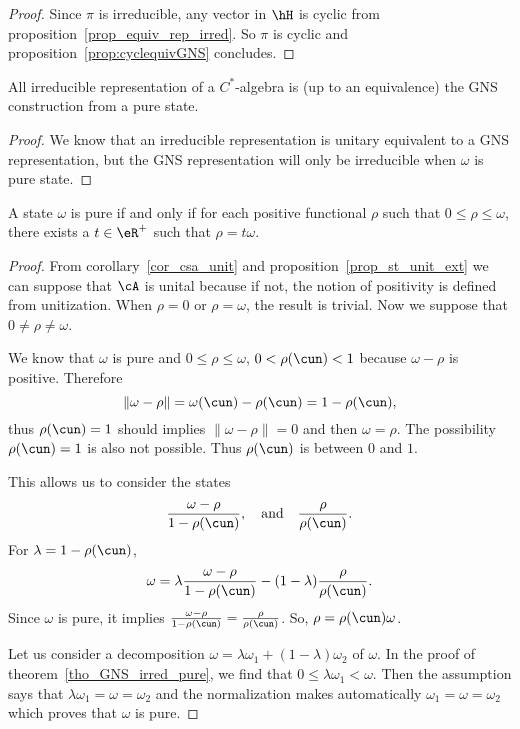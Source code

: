 \begin{proof}
    Since $\pi$ is irreducible, any vector in $\hH$ is cyclic from proposition~\ref{prop_equiv_rep_irred}. So $\pi$ is cyclic and proposition~\ref{prop:cyclequivGNS} concludes.

\end{proof}

\begin{corollary}
All irreducible representation of a $C^*$-algebra is (up to an equivalence) the GNS construction from a pure state.
\end{corollary}


\begin{proof}
We know that an irreducible representation is unitary equivalent to a GNS representation, but the GNS representation will only be irreducible when $\omega$ is pure state.
\end{proof}


\begin{proposition}
A state $\omega$ is pure if and only if for each positive functional $\rho$ such that $0\leq \rho\leq\omega$, there exists a $t\in\eR^+$ such that $\rho=t\omega$.
\label{prop_pureiff}
\end{proposition}

\begin{proof}
From corollary~\ref{cor_csa_unit} and  proposition~\ref{prop_st_unit_ext} we can suppose that $\cA$ is unital because if not, the notion of positivity is defined from unitization. When $\rho=0$ or $\rho=\omega$, the result is trivial. Now we suppose that $0\neq\rho\neq\omega$.


We know that $\omega$ is pure and $0\leq\rho\leq\omega$, $0<\rho(\cun)<1$ because $\omega-\rho$ is positive. Therefore
\[
  \| \omega-\rho \|=\omega(\cun)-\rho(\cun)=1-\rho(\cun),
\]
thus $\rho(\cun)=1$ should implies $\| \omega-\rho \|=0$ and then $\omega=\rho$. The possibility $\rho(\cun)=1$ is also not possible. Thus $\rho(\cun)$ is between $0$ and $1$.

This allows us to consider the states
\[
  \frac{ \omega-\rho }{ 1-\rho(\cun) },\quad\text{and}\quad\frac{ \rho }{ \rho(\cun) }.
\]
For $\lambda=1-\rho(\cun)$,
\[
  \omega=\lambda\frac{ \omega-\rho }{ 1-\rho(\cun) }-(1-\lambda)\frac{ \rho }{ \rho(\cun) }.
\]
Since $\omega$ is pure, it implies $\frac{ \omega-\rho }{ 1-\rho(\cun) }=\frac{ \rho }{ \rho(\cun) }$. So, $\rho=\rho(\cun)\omega$.


Let us consider a decomposition $\omega=\lambda\omega_1+(1-\lambda)\omega_2$ of $\omega$. In the proof of theorem~\ref{tho_GNS_irred_pure}, we find that $0\leq\lambda\omega_1<\omega$. Then the assumption says that $\lambda\omega_1=\omega=\omega_2$ and the normalization makes automatically $\omega_1=\omega=\omega_2$ which proves that $\omega$ is pure.

\end{proof}


